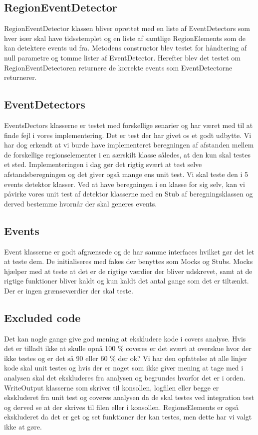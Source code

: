 \subsection{RegionEventDetector}
RegionEventDetector klassen bliver oprettet med en liste af EventDetectors som hver især skal have tidsstemplet og en liste af samtlige RegionElements som de kan detektere events ud fra. Metodens constructor blev testet for håndtering af null parametre og tomme lister af EventDetector. Herefter blev det testet om RegionEventDetectoren returnere de korrekte events som EventDetectorne returnerer.  

\subsection{EventDetectors}
EventsDectors klasserne er testet med forskellige senarier og har været med til at finde fejl i vores implementering. Det er test der har givet os et godt udbytte. Vi har dog erkendt at vi burde have implementeret beregningen af afstanden mellem de forskellige regionselementer i en særskilt klasse således, at den kun skal testes et sted. Implementeringen i dag gør det rigtig svært at test selve afstandsberegningen og det giver også mange ens unit test. Vi skal teste den i 5 events detektor klasser. Ved at have beregningen i en klasse for sig selv, kan vi påvirke vores unit test af detektor klasserne med en Stub af beregningsklassen og derved bestemme hvornår der skal generes events.

\subsection{Events}
Event klasserne er godt afgrænsede og de har samme interfaces hvilket gør det let at teste dem. De initialiseres med fakes der benyttes som Mocks og Stubs. Mocks hjælper med at teste at det er de rigtige værdier der bliver udskrevet, samt at de rigtige funktioner bliver kaldt og kun kaldt det antal gange som det er tiltænkt. Der er ingen grænseværdier der skal teste.

\subsection{Excluded code}
Det kan nogle gange give god mening at ekskludere kode i covers analyse. Hvis det er tilladt ikke at skulle opnå 100 \% coveres er det svært at overskue hvor der ikke testes og er det så 90 eller 60 \% der ok? Vi har den opfattelse at alle linjer kode skal unit testes og hvis der er noget som ikke giver mening at tage med i analysen skal det ekskluderes fra analysen og begrundes hvorfor det er i orden.
WriteOutput klasserne som skriver til konsollen, logfilen eller begge er ekskluderet fra unit test og coveres analysen da de skal testes ved integration test og derved se at der skrives til filen eller i konsollen. 
RegionsElements er også ekskluderet da det er get og set funktioner der kan testes, men dette har vi valgt ikke at gøre.

